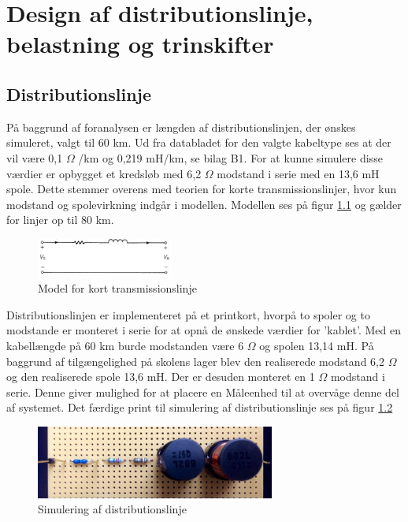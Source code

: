 
\chapter{Design af distributionslinje, belastning og trinskifter}

\section{Distributionslinje}
På baggrund af foranalysen er længden af distributionslinjen, der ønskes simuleret, valgt til 60 km. Ud fra databladet for den valgte kabeltype ses at der  vil være 0,1 $\Omega$ /km og 0,219 mH/km, se bilag B1. For at kunne simulere disse værdier er opbygget et kredsløb med 6,2 $\Omega$ modstand i serie med en 13,6 mH spole. Dette stemmer overens med teorien for korte transmissionslinjer, hvor kun modstand og spolevirkning indgår i modellen. Modellen ses på figur \ref{fig:Kortlinjemodel} og gælder for linjer op til 80 km. 

\begin{figure}[htbp] %
	\centering
	\includegraphics[width=0.4\textwidth]{Figure/Kortlinjemodel2}
	\caption{Model for kort transmissionslinje}
	\label{fig:Kortlinjemodel}
\end{figure}


Distributionslinjen er implementeret på et printkort, hvorpå to spoler og to modstande er monteret i serie for at opnå de ønskede værdier for 'kablet'. Med en kabellængde på 60 km burde modstanden være 6 $\Omega$ og spolen 13,14 mH. På baggrund af tilgængelighed på skolens lager blev den realiserede modstand 6,2 $\Omega$ og den realiserede spole 13,6 mH. Der er desuden monteret en 1 $\Omega$ modstand i serie. Denne giver mulighed for at placere en Måleenhed til at overvåge denne del af systemet. Det færdige print til simulering af distributionslinje ses på figur \ref{fig:Disblinje}

\begin{figure}[H] 
	\centering
	\includegraphics[width=0.7\textwidth]{Figure/Distributionslinje}
	\caption{Simulering af distributionslinje}
	\label{fig:Disblinje}
\end{figure}
